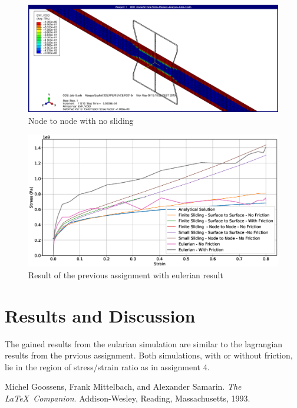 \documentclass[12pt]{article}
\begin{document}
\begin{figure}[!htb]
  \centering
  \includegraphics[width=0.9\linewidth]{pics/sexy3Dbild}
  \caption{Node to node with no sliding}
  \label{fig:2}
\end{figure}

\begin{figure}[!htb]
  \centering
  \includegraphics[width=0.9\linewidth]{pics/analytical_compared_euler}
  \caption{Result of the previous assignment with eulerian result}
  \label{fig:3}
\end{figure}


\pagebreak
\section{Results and Discussion}

The gained results from the eularian simulation are similar to the lagrangian results from the 
prvious assignment. Both simulations, with or without friction, lie in the region
of stress/strain ratio as in assignment 4. 


\pagebreak
\begin{thebibliography}{9}
  Michel Goossens, Frank Mittelbach, and Alexander Samarin. 
  \textit{The \LaTeX\ Companion}. 
  Addison-Wesley, Reading, Massachusetts, 1993.
\end{thebibliography}
\end{document}
